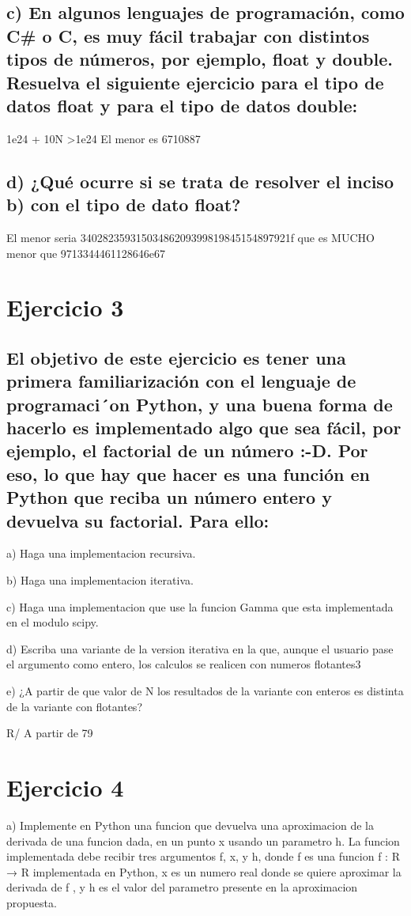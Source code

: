 \documentclass[a4paper,12pt]{article}
\begin{document}
\subsection*{c) En algunos lenguajes de programación, como C\# o C, es muy fácil trabajar
con distintos tipos de números, por ejemplo, float y double. Resuelva el siguiente ejercicio
para el tipo de datos float y para el tipo de datos double:
}
1e24 + 10N >1e24 El menor es 6710887

\subsection*{d) ¿Qué ocurre si se trata de resolver el inciso b) con el tipo de dato float?}

El menor seria 34028235931503486209399819845154897921f que es MUCHO menor que 9713344461128646e67

\section*{Ejercicio 3}
\subsection*{El objetivo de este ejercicio es tener una primera familiarización con el lenguaje de programaci´on
Python, y una buena forma de hacerlo es implementado algo que sea fácil, por ejemplo, el factorial
de un número :-D. Por eso, lo que hay que hacer es una función en Python que reciba un número
entero y devuelva su factorial. Para ello:}

a) Haga una implementacion recursiva.

b) Haga una implementacion iterativa.

c) Haga una implementacion que use la funcion Gamma que esta implementada
en el modulo scipy.

d) Escriba una variante de la version iterativa en la que, aunque el usuario
pase el argumento como entero, los calculos se realicen con numeros flotantes3

e) ¿A partir de que valor de N los resultados de la variante con enteros es
distinta de la variante con flotantes? 

R/ A partir de 79

\section*{Ejercicio 4}
a) Implemente en Python una funcion que devuelva una aproximacion de la derivada de una
funcion dada, en un punto x usando un parametro h. La funcion implementada debe recibir
tres argumentos f, x, y h, donde f es una funcion f : R → R implementada en Python, x
es un numero real donde se quiere aproximar la derivada de f , y h es el valor del parametro
presente en la aproximacion propuesta.
\end{document}
